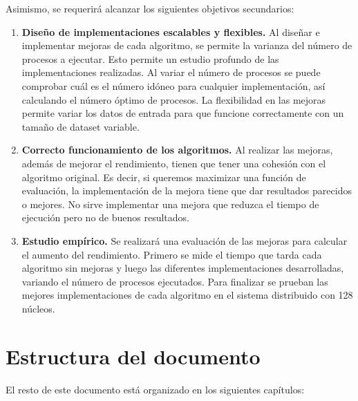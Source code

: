 	Asimismo, se requerirá alcanzar los siguientes objetivos secundarios:
	
	\begin{enumerate}
		\item \textbf{Diseño de implementaciones escalables y flexibles.} Al diseñar e implementar mejoras de cada algoritmo, se permite la varianza del número de procesos a ejecutar. Esto permite un estudio profundo de las implementaciones realizadas. Al variar el número de procesos se puede comprobar cuál es el número idóneo para cualquier implementación, así calculando el número óptimo de procesos. La flexibilidad en las mejoras permite variar los datos de entrada para que funcione correctamente con un tamaño de dataset variable.
		\item \textbf{Correcto funcionamiento de los algoritmos.} Al realizar las mejoras, además de mejorar el rendimiento, tienen que tener una cohesión con el algoritmo original. Es decir, si queremos maximizar una función de evaluación, la implementación de la mejora tiene que dar resultados parecidos o mejores. No sirve implementar una mejora que reduzca el tiempo de ejecución pero no de buenos resultados.
		\item \textbf{Estudio empírico.} Se realizará una evaluación de las mejoras para calcular el aumento del rendimiento. Primero se mide el tiempo que tarda cada algoritmo sin mejoras y luego las diferentes implementaciones desarrolladas, variando el número de procesos ejecutados. Para finalizar se prueban las mejores implementaciones de cada algoritmo en el sistema distribuido con 128 núcleos.
	\end{enumerate}





\section{Estructura del documento}
	El resto de este documento está organizado en los siguientes capítulos:
	
